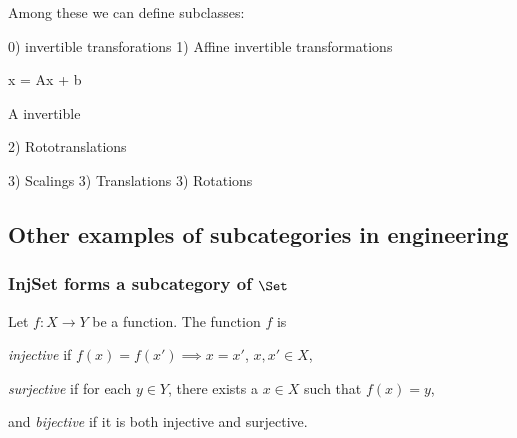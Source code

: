 Among these we can define subclasses:

0) invertible transforations
1) Affine invertible transformations 

x = Ax + b

A invertible

2) Rototranslations

3) Scalings 
3) Translations
3) Rotations




\subsection{Other examples of subcategories in engineering}






\subsubsection{InjSet forms a subcategory of $\Set$}
\begin{definition}
Let $f\colon X\to Y$ be a function. The function $f$ is
\begin{compactenum}
    \item \emph{injective} if $f(x)=f(x')\implies x=x'$, $x,x'\in X$,
    \item \emph{surjective} if for each $y\in Y$, there exists a $x\in X$ such that $f(x)=y$,
    \item and \emph{bijective} if it is both injective and surjective.
\end{compactenum}
\end{definition}

